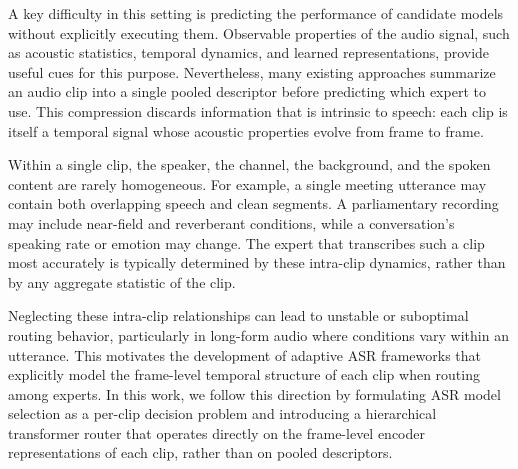 \documentclass[journal]{IEEEtran}
\begin{document}
A key difficulty in this setting is predicting the performance of
candidate models without explicitly executing them. Observable
properties of the audio signal, such as acoustic statistics, temporal
dynamics, and learned representations, provide useful cues for this
purpose. Nevertheless, many existing approaches summarize an audio
clip into a single pooled descriptor before predicting which expert
to use. This compression discards information that is intrinsic to
speech: each clip is itself a temporal signal whose acoustic
properties evolve from frame to frame.

Within a single clip, the speaker, the channel, the background, and
the spoken content are rarely homogeneous. For example, a single meeting utterance may contain both overlapping speech and clean segments. A parliamentary recording may include near-field and reverberant conditions, while a conversation's speaking rate or emotion may change. The expert that transcribes such a clip most
accurately is typically determined by these intra-clip dynamics,
rather than by any aggregate statistic of the clip.

Neglecting these intra-clip relationships can lead to unstable or
suboptimal routing behavior, particularly in long-form audio where
conditions vary within an utterance. This motivates the development of
adaptive ASR frameworks that explicitly model the frame-level temporal
structure of each clip when routing among experts. In this work, we
follow this direction by formulating ASR model selection as a per-clip
decision problem and introducing a hierarchical transformer router that
operates directly on the frame-level encoder representations of each
clip, rather than on pooled descriptors.
 


\end{document}
